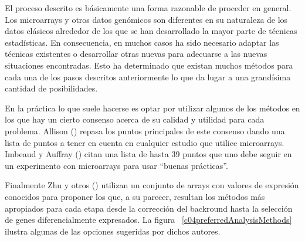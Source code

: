 
\vspace{-0.5cm}
\begin{figure}[!h]
\label{c04analysisProcess}
\end{figure}



El proceso descrito es b\'asicamente una forma razonable de proceder en general.
Los microarrays y otros datos gen\'omicos son diferentes en su naturaleza de
los datos cl\'asicos alrededor de los que se han desarrollado la mayor parte de
t\'ecnicas estad\'isticas. En consecuencia, en muchos casos ha sido necesario
adaptar las t\'ecnicas existentes o desarrollar otras nuevas para adecuarse a las nuevas situaciones encontradas.
Esto ha determinado que existan muchos m\'etodos para cada una de los pasos descritos anteriormente lo que da lugar a una grand\'isima cantidad de
posibilidades.

En la pr\'actica lo que suele hacerse es optar por utilizar algunos de los m\'etodos en los que hay un cierto consenso acerca de su calidad y
utilidad para cada problema. Allison (\cite{Allison:2006a}) repasa los puntos principales de este consenso dando una lista de puntos a tener en
cuenta en cualquier estudio que utilice microarrays. Imbeaud y Auffray (\cite{Imbeaud:2005}) citan una lista de hasta 39 puntos que uno debe
seguir en un experimento con microarrays para usar ``buenas pr\'acticas''.

Finalmente Zhu y otros (\cite{Zhu:2010}) utilizan un conjunto de
arrays con valores de expresi\'on conocidos para proponer los que, a su parecer, resultan los m\'etodos m\'as apropiados para cada etapa desde la
correcci\'on del backround hasta la selecci\'on de genes diferencialmente expresados.
La figura ~\ref{c04preferredAnalysisMethods} ilustra algunas de las opciones sugeridas por dichos autores.


